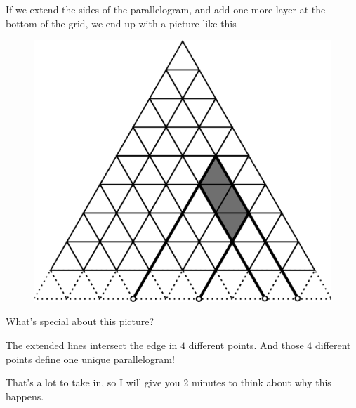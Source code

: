 \documentclass[compress]{beamer}
\begin{document}
\begin{frame}
    If we extend the sides of the parallelogram, and add one more layer at the
    bottom of the grid, we end up with a picture like this

    \pause\vspace{1em}

    \begin{minipage}{.4\linewidth}

        \begin{figure}
            \begin{center}
                \includegraphics[width=\linewidth]{trig_grid_2.pdf}
            \end{center}
        \end{figure}
    \end{minipage}\hfill%
    \begin{minipage}{.55\linewidth}
        \pause\vspace{1em}

        What's special about this picture?

        \pause\vspace{1em}

        The extended lines intersect the edge in $4$ different points.
        \textcolor{NordRed}{And those $4$ different points define one unique
        parallelogram!}
    \end{minipage}
    
    \pause\vspace{1em}

    \textcolor{NordGreen}{That's a lot to take in, so I will give you 2
    minutes to think about why this happens.}

\end{frame}
\end{document}
